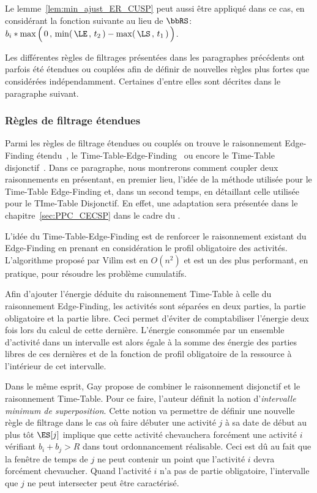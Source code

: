 Le lemme~\ref{lem:min_ajust_ER_CUSP} peut aussi être appliqué dans ce
cas, en considérant la fonction suivante au lieu de $\bbRS$:
$b_i*\max\Big(\, 0\, , \, \min(\, \LE\, ,\, t_2\,) - \max(\, \LS\, ,
  \, t_1\,) \,\Big)$. 


Les différentes règles de filtrages présentées dans les paragraphes
précédents ont parfois été étendues ou couplées afin de définir de
nouvelles règles plus fortes que considérées indépendamment. Certaines
d'entre elles sont décrites dans le paragraphe suivant. 


\subsubsection{Règles de filtrage étendues}
\label{sec:mix_CUSP}

Parmi les règles de filtrage étendues ou couplés on trouve le
raisonnement Edge-Finding étendu~\cite{ExtEF}, le
Time-Table-Edge-Finding~\cite{V11} ou encore le Time-Table
disjonctif~\cite{Gay2015}. Dans ce paragraphe, nous montrerons comment
coupler deux raisonnements en présentant, en premier lieu, l'idée de
la méthode utilisée pour le Time-Table Edge-Finding et, dans un second
temps, en détaillant celle utilisée pour le TIme-Table Disjonctif. En
effet, une adaptation sera présentée dans le
chapitre~\ref{sec:PPC_CECSP} dans le cadre du \CECSP.

L'idée du Time-Table-Edge-Finding est de renforcer le raisonnement
existant du Edge-Finding en prenant en considération le profil
obligatoire des activités. L'algorithme proposé par Vil{\`i}m est en
$O(n^2)$ et est un des plus performant, en pratique, pour résoudre les
problème cumulatifs. 

Afin d'ajouter l'énergie déduite du raisonnement Time-Table à celle du
raisonnement Edge-Finding, les activités sont séparées en deux
parties, la partie obligatoire et la partie libre. Ceci permet
d'éviter de comptabiliser l'énergie deux fois lors du calcul de cette
dernière. L'énergie consommée par un ensemble d'activité dans un
intervalle est alors égale à la somme des énergie des parties libres
de ces dernières et de la fonction de profil obligatoire de la
ressource à l'intérieur de cet intervalle. 

Dans le même esprit, Gay propose de combiner le raisonnement
disjonctif et le raisonnement Time-Table. Pour ce faire, l'auteur
définit la notion d'{\it intervalle minimum de superposition}. Cette
notion va permettre de définir une nouvelle règle de filtrage dans le
cas où faire débuter une activité $j$ à sa date de début au plus tôt
$\ES[j]$ implique que cette activité chevauchera forcément une
activité $i$ vérifiant $b_i+b_j > R$ dans tout ordonnancement
réalisable. Ceci est dû au fait que la fenêtre de temps de $j$ ne peut
contenir un point que l'activité $i$ devra forcément chevaucher. Quand
l'activité $i$ n'a pas de partie obligatoire, l'intervalle que $j$ ne
peut intersecter peut être caractérisé. 

